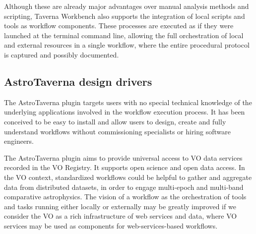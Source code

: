 \documentclass[final,authoryear,5p,times,twocolumn]{elsarticle}
\begin{document}
Although these are already major advantages over manual analysis methods and scripting, Taverna Workbench also supports the integration of local scripts and tools as workflow components. These processes are executed as if they were launched at the terminal command line, allowing the full orchestration of local and external resources in a single workflow, where the entire procedural protocol is captured and possibly documented. 


\subsection{AstroTaverna design drivers}
\label{Drivers}

The AstroTaverna plugin targets users with no special technical knowledge of the underlying applications involved in the workflow execution process. It has been conceived to be easy to install and allow users to design, create and fully understand workflows without commissioning specialists or hiring software engineers. 

The AstroTaverna plugin aims to provide universal access to VO data services recorded in the VO Registry. It supports open science and open data access. In the VO context, standardized workflows could be helpful to gather and aggregate data from distributed datasets, in order to engage multi-epoch and multi-band comparative astrophysics. The vision of a workflow as the orchestration of tools and tasks running either locally or externally may be greatly improved if we consider the VO as a rich infrastructure of web services and data, where VO services may be used as components for web-services-based workflows. 
\end{document}

